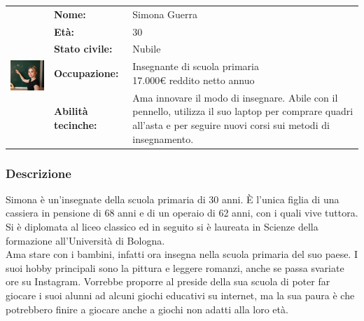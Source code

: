 \documentclass[../Report.tex]{subfiles}
\begin{document}
    \vspace{1.5cm}

    \begin{table}[H]
        \begin{tabular}{|c|l|p{7cm}|}
            \hline
            \multirow{5}{*}{\includegraphics[width=5cm, height=5cm]{Simona.jpg}} 
                & \textbf{Nome:} & Simona Guerra\\ \cmidrule{2-3}
            & \textbf{Età:} & 30 \\ \cmidrule{2-3}
            & \textbf{Stato civile:} & Nubile \\ \cmidrule{2-3}
            & \textbf{Occupazione:} & \makecell{Insegnante di scuola primaria \\ 17.000€ reddito netto annuo} \\ \cmidrule{2-3}
            & \textbf{Abilità tecinche:} &  Ama innovare il modo di insegnare. Abile con il pennello, utilizza il suo laptop per comprare quadri all'asta e per seguire nuovi corsi sui metodi di insegnamento.\\
            \hline
        \end{tabular}
    \end{table}

    \subsubsection{Descrizione}
    Simona è un'insegnate della scuola primaria di 30 anni. È l'unica figlia di una cassiera in pensione di 68 anni e di un operaio di 62 anni, con i quali vive tuttora. Si è diplomata al liceo classico ed in seguito si è laureata in Scienze della formazione all'Università di Bologna.\\
    Ama stare con i bambini, infatti ora insegna nella scuola primaria del suo paese. I suoi hobby principali sono la pittura e leggere romanzi, anche se passa svariate ore su Instagram. Vorrebbe proporre al preside della sua scuola di poter far giocare i suoi alunni ad alcuni giochi educativi su internet, ma la sua paura è che potrebbero finire a giocare anche a giochi non adatti alla loro età.
\end{document}
